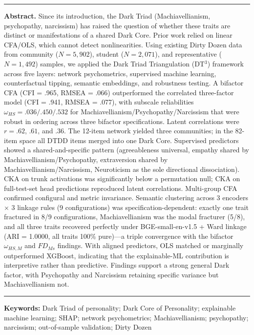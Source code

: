 \documentclass[11pt,twocolumn]{article}
\begin{document}
\noindent\rule{\linewidth}{0.4pt}
\noindent\textbf{Abstract.} Since its introduction, the Dark Triad (Machiavellianism, psychopathy, narcissism) has raised the question of whether these traits are distinct or manifestations of a shared Dark Core. Prior work relied on linear CFA/OLS, which cannot detect nonlinearities. Using existing Dirty Dozen data from community ($N = 5{,}902$), student ($N = 2{,}071$), and representative ($N = 1{,}492$) samples, we applied the Dark Triad Triangulation (DT$^3$) framework across five layers: network psychometrics, supervised machine learning, counterfactual tipping, semantic embeddings, and robustness testing. A bifactor CFA (CFI = .965, RMSEA = .066) outperformed the correlated three-factor model (CFI = .941, RMSEA = .077), with subscale reliabilities $\omega_{HS} = .036/.450/.532$ for Machiavellianism/Psychopathy/Narcissism that were robust in ordering across three bifactor specifications. Latent correlations were $r = .62$, $.61$, and $.36$. The 12-item network yielded three communities; in the 82-item space all DTDD items merged into one Dark Core. Supervised predictors showed a shared-and-specific pattern (agreeableness universal, empathy shared by Machiavellianism/Psychopathy, extraversion shared by Machiavellianism/Narcissism, Neuroticism as the sole directional dissociation). CKA on trunk activations was significantly below a permutation null; CKA on full-test-set head predictions reproduced latent correlations. Multi-group CFA confirmed configural and metric invariance. Semantic clustering across 3 encoders $\times$ 3 linkage rules (9 configurations) was specification-dependent: exactly one trait fractured in 8/9 configurations, Machiavellianism was the modal fracturer (5/8), and all three traits recovered perfectly under BGE-small-en-v1.5 + Ward linkage (ARI = 1.0000, all traits 100\% pure)---a triple convergence with the bifactor $\omega_{HS,M}$ and $FD_{Ms}$ findings. With aligned predictors, OLS matched or marginally outperformed XGBoost, indicating that the explainable-ML contribution is interpretive rather than predictive. Findings support a strong general Dark factor, with Psychopathy and Narcissism retaining specific variance but Machiavellianism not.
\noindent\rule{\linewidth}{0.4pt}

\par\vspace{0.5em}
\noindent\textbf{Keywords:} Dark Triad of personality; Dark Core of Personality; explainable machine learning; SHAP; network psychometrics; Machiavellianism; psychopathy; narcissism; out-of-sample validation; Dirty Dozen
\end{document}
